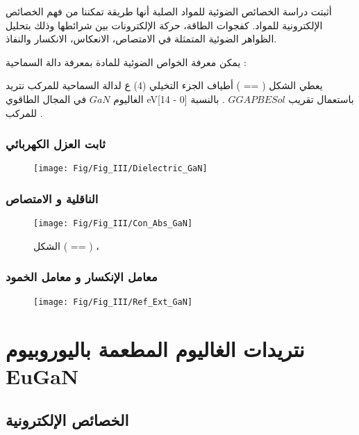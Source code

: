 أثبتت دراسة الخصائص الضوئية للمواد الصلبة أنها طريقة تمكننا من فهم الخصائص الإلكترونية للمواد. كفجوات الطاقة، حركة الإلكترونات بين شرائطها وذلك بتحليل الظواهر الضوئية المتمثلة في الامتصاص، الانعكاس، الانكسار والنفاذ.

يمكن معرفة الخواص الضوئية للمادة بمعرفة دالة السماحية :

يعطي الشكل ( == ) أطياف الجزء التخيلي (4) ع لدالة السماحية للمركب نتريد الغاليوم  $ GaN  $  في المجال الطاقوي eV[14 - 0] باستعمال تقريب $ GGAPBESol $ .
بالنسبة للمركب . 

\subsubsection{ثابت العزل الكهربائي }

\begin{figure}[h!]
	\centering
	\texttt{[image: Fig/Fig\_III/Dielectric\_GaN]}
	\caption{}
	\label{fig:dielectricgan}
\end{figure}
\FloatBarrier

\subsubsection{الناقلية و الامتصاص}

\begin{figure}[h!]
	\centering
	\texttt{[image: Fig/Fig\_III/Con\_Abs\_GaN]}
	\caption{}الشكل ( == ) ، 
	\label{fig:conabsgan}
\end{figure}
\FloatBarrier

\subsubsection{معامل الإنكسار و معامل الخمود}

\begin{figure}[h!]
	\centering
	\texttt{[image: Fig/Fig\_III/Ref\_Ext\_GaN]}
	\caption{}
	\label{fig:refextgan}
\end{figure}
\FloatBarrier

\section{    نتريدات الغاليوم المطعمة باليوروبيوم EuGaN }
\subsection{الخصائص الإلكترونية }

